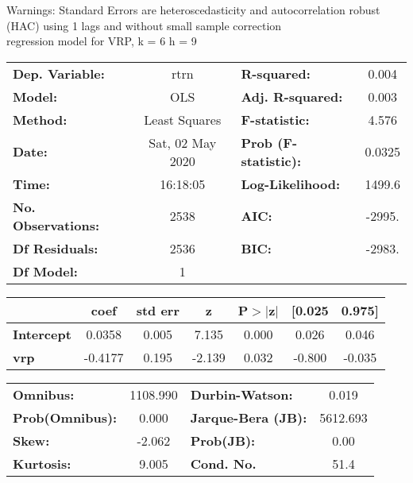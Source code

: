 Warnings: \newline
 [1] Standard Errors are heteroscedasticity and autocorrelation robust (HAC) using 1 lags and without small sample correction\\ 

regression model for VRP, k = 6 h = 9\begin{center}
\begin{tabular}{lclc}
\toprule
\textbf{Dep. Variable:}    &       rtrn       & \textbf{  R-squared:         } &     0.004   \\
\textbf{Model:}            &       OLS        & \textbf{  Adj. R-squared:    } &     0.003   \\
\textbf{Method:}           &  Least Squares   & \textbf{  F-statistic:       } &     4.576   \\
\textbf{Date:}             & Sat, 02 May 2020 & \textbf{  Prob (F-statistic):} &   0.0325    \\
\textbf{Time:}             &     16:18:05     & \textbf{  Log-Likelihood:    } &    1499.6   \\
\textbf{No. Observations:} &        2538      & \textbf{  AIC:               } &    -2995.   \\
\textbf{Df Residuals:}     &        2536      & \textbf{  BIC:               } &    -2983.   \\
\textbf{Df Model:}         &           1      & \textbf{                     } &             \\
\bottomrule
\end{tabular}
\begin{tabular}{lcccccc}
                   & \textbf{coef} & \textbf{std err} & \textbf{z} & \textbf{P$> |$z$|$} & \textbf{[0.025} & \textbf{0.975]}  \\
\midrule
\textbf{Intercept} &       0.0358  &        0.005     &     7.135  &         0.000        &        0.026    &        0.046     \\
\textbf{vrp}       &      -0.4177  &        0.195     &    -2.139  &         0.032        &       -0.800    &       -0.035     \\
\bottomrule
\end{tabular}
\begin{tabular}{lclc}
\textbf{Omnibus:}       & 1108.990 & \textbf{  Durbin-Watson:     } &    0.019  \\
\textbf{Prob(Omnibus):} &   0.000  & \textbf{  Jarque-Bera (JB):  } & 5612.693  \\
\textbf{Skew:}          &  -2.062  & \textbf{  Prob(JB):          } &     0.00  \\
\textbf{Kurtosis:}      &   9.005  & \textbf{  Cond. No.          } &     51.4  \\
\bottomrule
\end{tabular}
\end{center}


